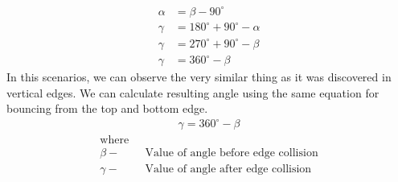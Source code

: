 \documentclass[]{report}
\begin{document}
\begin{equation}
\begin{aligned}
\label{eq:bottom_edge}
\alpha &= \beta - 90^{\circ} \\
\gamma &= 180^{\circ} + 90^{\circ} - \alpha \\
\gamma &= 270^{\circ} + 90^{\circ} - \beta \\
\gamma &= 360^{\circ} - \beta 
\end{aligned}
\end{equation}
In this scenarios, we can observe the very similar thing as it was discovered in vertical edges. We can calculate resulting angle using the same equation for bouncing from the top and bottom edge.
\begin{equation}
\begin{aligned}
\label{eq:horizontal_edge}
\gamma = 360^{\circ} - \beta
\end{aligned}
\end{equation}
\begin{align*}
\text{where} \\
\beta -& \text{~~Value of angle before edge collision} \\
\gamma -& \text{~~Value of angle after edge collision}
\end{align*}
\end{document}
